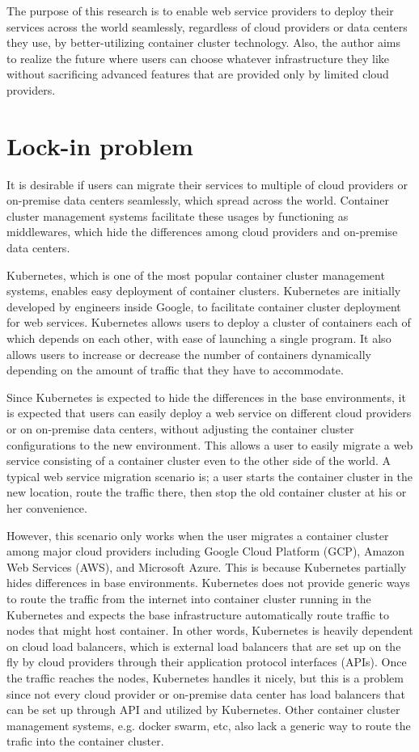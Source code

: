 The purpose of this research is to enable web service providers to deploy their services across the world seamlessly, regardless of cloud providers or data centers they use, by better-utilizing container cluster technology. 
Also, the author aims to realize the future where users can choose whatever infrastructure they like without sacrificing advanced features that are provided only by limited cloud providers.

\section{Lock-in problem}

It is desirable if users can migrate their services to multiple of cloud providers or on-premise data centers seamlessly, which spread across the world.
Container cluster management systems facilitate these usages by functioning as middlewares, which hide the differences among cloud providers and on-premise data centers.

Kubernetes\cite{K8s2017}, which is one of the most popular container cluster management systems, enables easy deployment of container clusters.
Kubernetes are initially developed by engineers inside Google, to facilitate container cluster deployment for web services.
Kubernetes allows users to deploy a cluster of containers each of which depends on each other, with ease of launching a single program.
It also allows users to increase or decrease the number of containers dynamically depending on the amount of traffic that they have to accommodate.

Since Kubernetes is expected to hide the differences in the base environments, it is expected that users can easily deploy a web service on different cloud providers or on on-premise data centers, without adjusting the container cluster configurations to the new environment. 
This allows a user to easily migrate a web service consisting of a container cluster even to the other side of the world.
A typical web service migration scenario is; 
a user starts the container cluster in the new location, route the traffic there, then stop the old container cluster at his or her convenience.

However, this scenario only works when the user migrates a container cluster among major cloud providers including Google Cloud Platform (GCP), Amazon Web Services (AWS), and Microsoft Azure.
This is because Kubernetes partially hides differences in base environments.
Kubernetes does not provide generic ways to route the traffic from the internet into container cluster running in the Kubernetes and expects the base infrastructure automatically route traffic to nodes that might host container.
In other words, Kubernetes is heavily dependent on cloud load balancers, which is external load balancers that are set up on the fly by cloud providers through their application protocol interfaces (APIs).
Once the traffic reaches the nodes, Kubernetes handles it nicely, but this is a problem since not every cloud provider or on-premise data center has load balancers that can be set up through API and utilized by Kubernetes.
Other container cluster management systems, e.g. docker swarm, etc, also lack a generic way to route the trafic into the container cluster.


